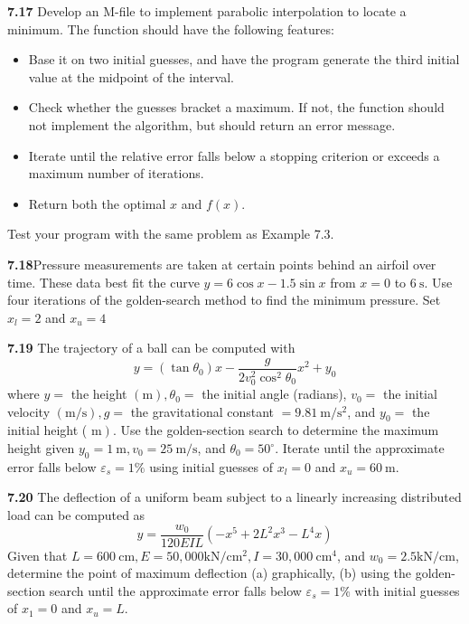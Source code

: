 \documentclass[../main.tex]{subfiles}
\begin{document}
\begin{multicols}{2}
	\noindent \textbf{7.17} Develop an M-file to implement parabolic interpolation to locate a minimum. The function should have the following features:
	\begin{itemize}
		\item Base it on two initial guesses, and have the program generate the third initial value at the midpoint of the interval.
		\item Check whether the guesses bracket a maximum. If not, the function should not implement the algorithm, but should return an error message.
		\item Iterate until the relative error falls below a stopping criterion or exceeds a maximum number of iterations.	
		\item Return both the optimal $x$ and $f(x)$.
	\end{itemize}
	
	\noindent Test your program with the same problem as Example 7.3.
	
	\noindent \textbf{7.18}Pressure measurements are taken at certain points behind an airfoil over time. These data best fit the curve $y=6 \cos x-1.5 \sin x$ from $x=0$ to $6 \mathrm{~s}$. Use four iterations of the golden-search method to find the minimum pressure. Set $x_{l}=2$ and $x_{u}=4$
	
	\noindent \textbf{7.19} The trajectory of a ball can be computed with
	$$
	y=\left(\tan \theta_{0}\right) x-\frac{g}{2 v_{0}^{2} \cos ^{2} \theta_{0}} x^{2}+y_{0}
	$$
	where $y=$ the height $(\mathrm{m}), \theta_{0}=$ the initial angle (radians), $v_{0}=$ the initial velocity $(\mathrm{m} / \mathrm{s}), g=$ the gravitational constant $=9.81 \mathrm{~m} / \mathrm{s}^{2}$, and $y_{0}=$ the initial height ( $\left.\mathrm{m}\right)$. Use the golden-section search to determine the maximum height given $y_{0}=1 \mathrm{~m}, v_{0}=25 \mathrm{~m} / \mathrm{s}$, and $\theta_{0}=50^{\circ}$. Iterate until the approximate error falls below $\varepsilon_{s}=1 \%$ using initial guesses of $x_{l}=0$ and $x_{u}=60 \mathrm{~m}$.
	
	\noindent \textbf{7.20} The deflection of a uniform beam subject to a linearly increasing distributed load can be computed as
	$$
	y=\frac{w_{0}}{120 E I L}\left(-x^{5}+2 L^{2} x^{3}-L^{4} x\right)
	$$
	Given that $L=600 \mathrm{~cm}, E=50,000 \mathrm{kN} / \mathrm{cm}^{2}, I=30,000 \mathrm{~cm}^{4}$, and $w_{0}=2.5 \mathrm{kN} / \mathrm{cm}$, determine the point of maximum deflection (a) graphically, (b) using the golden-section search until the approximate error falls below $\varepsilon_{s}=1 \%$ with initial guesses of $x_{1}=0$ and $x_{u}=L$.
	

\end{multicols}
\end{document}
